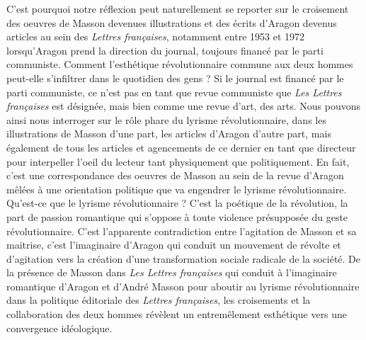 C’est pourquoi notre réflexion peut naturellement se reporter sur le croisement des oeuvres de Masson devenues illustrations et des écrits d’Aragon devenus articles au sein des \emph{Lettres françaises}, notamment entre 1953 et 1972 lorsqu’Aragon prend la direction du journal, toujours financé par le parti communiste. Comment l’esthétique révolutionnaire commune aux deux hommes peut-elle s’infiltrer dans le quotidien des gens ? Si le journal est financé par le parti communiste, ce n’est pas en tant que revue communiste que \emph{Les Lettres françaises} est désignée, mais bien comme une revue d’art, des arts. Nous pouvons ainsi nous interroger sur le rôle phare du lyrisme révolutionnaire, dans les illustrations de Masson d’une part, les articles d’Aragon d’autre part, mais également de tous les articles et agencements de ce dernier en tant que directeur pour interpeller l’oeil du lecteur tant physiquement que politiquement. En fait, c’est une correspondance des oeuvres de Masson au sein de la revue d’Aragon mêlées à une orientation politique que va engendrer le lyrisme révolutionnaire. Qu’est-ce que le lyrisme révolutionnaire ? C’est la poétique de la révolution, la part de passion romantique qui s’oppose à toute violence présupposée du geste révolutionnaire. C’est l’apparente contradiction entre l’agitation de Masson et sa maitrise, c’est l’imaginaire d’Aragon qui conduit un mouvement de révolte et d’agitation vers la création d’une transformation sociale radicale de la société. De la présence de Masson dans \emph{Les Lettres françaises} qui conduit à l’imaginaire romantique d’Aragon et d’André Masson pour aboutir au lyrisme révolutionnaire dans la politique éditoriale des \emph{Lettres françaises}, les croisements et la collaboration des deux hommes révèlent un entremêlement esthétique vers une convergence idéologique. 